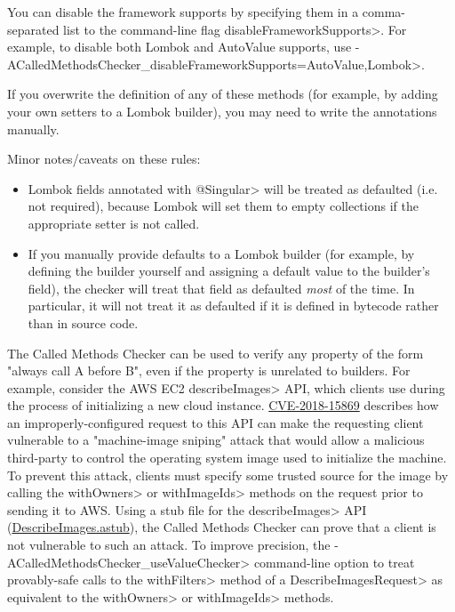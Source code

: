 You can disable the framework supports by specifying them in a comma-separated list to the
command-line flag \<disableFrameworkSupports>.  For example, to disable both Lombok and AutoValue supports,
use \<-ACalledMethodsChecker_disableFrameworkSupports=AutoValue,Lombok>.

If you overwrite the definition of any of these methods (for example, by adding your own setters to
a Lombok builder), you may need to write the annotations manually.

Minor notes/caveats on these rules:
\begin{itemize}
\item Lombok fields annotated with \<@Singular> will be treated as defaulted (i.e. not required), because
Lombok will set them to empty collections if the appropriate setter is not called.
\item If you manually provide defaults to a Lombok builder (for example, by defining the builder yourself
and assigning a default value to the builder's field), the checker will treat that field as defaulted
\emph{most} of the time. In particular, it will not treat it as defaulted if it is defined in bytecode rather
than in source code.
\end{itemize}


The Called Methods Checker can be used to verify any property of the form "always call A before B", even
if the property is unrelated to builders. For example, consider the AWS EC2 \<describeImages> API, which
clients use during the process of initializing a new cloud instance.
\href{https://cve.mitre.org/cgi-bin/cvename.cgi?name=CVE-2018-15869}{CVE-2018-15869} describes how an
improperly-configured request to this API can make the requesting client vulnerable to a "machine-image sniping"
attack that would allow a malicious third-party to control the operating system image used to initialize the
machine. To prevent this attack, clients must specify some trusted source for the image by calling the
\<withOwners> or \<withImageIds> methods on the request prior to sending it to AWS. Using a stub file for the
\<describeImages> API
(\href{https://github.com/typetools/checker-framework/blob/master/checker/src/main/java/org/checkerframework/calledmethods/DescribeImages.astub}{DescribeImages.astub}),
the Called Methods Checker can prove that a client is not vulnerable to such an attack. To improve precision,
the \<-ACalledMethodsChecker\_useValueChecker> command-line option to treat provably-safe calls to the \<withFilters>
method of a \<DescribeImagesRequest> as equivalent to the \<withOwners> or \<withImageIds> methods.
